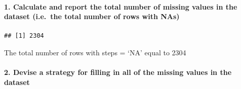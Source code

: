 \documentclass[
]{article}
\newenvironment{Shaded}{\begin{snugshade}}{\end{snugshade}}
\newcommand{\AttributeTok}[1]{\textcolor[rgb]{0.77,0.63,0.00}{#1}}
\newcommand{\CommentTok}[1]{\textcolor[rgb]{0.56,0.35,0.01}{\textit{#1}}}
\newcommand{\FunctionTok}[1]{\textcolor[rgb]{0.00,0.00,0.00}{#1}}
\newcommand{\NormalTok}[1]{#1}
\newcommand{\OtherTok}[1]{\textcolor[rgb]{0.56,0.35,0.01}{#1}}
\newcommand{\SpecialCharTok}[1]{\textcolor[rgb]{0.00,0.00,0.00}{#1}}
\newcommand{\StringTok}[1]{\textcolor[rgb]{0.31,0.60,0.02}{#1}}
\begin{document}
\hypertarget{calculate-and-report-the-total-number-of-missing-values-in-the-dataset-i.e.-the-total-number-of-rows-with-nas}{%
\paragraph{1. Calculate and report the total number of missing values in
the dataset (i.e.~the total number of rows with
NAs)}\label{calculate-and-report-the-total-number-of-missing-values-in-the-dataset-i.e.-the-total-number-of-rows-with-nas}}

\begin{Shaded}
\end{Shaded}

\begin{verbatim}
## [1] 2304
\end{verbatim}

The total number of rows with steps = `NA' equal to 2304

\hypertarget{devise-a-strategy-for-filling-in-all-of-the-missing-values-in-the-dataset}{%
\paragraph{2. Devise a strategy for filling in all of the missing values
in the
dataset}\label{devise-a-strategy-for-filling-in-all-of-the-missing-values-in-the-dataset}}

\begin{Shaded}
\end{Shaded}
\end{document}
